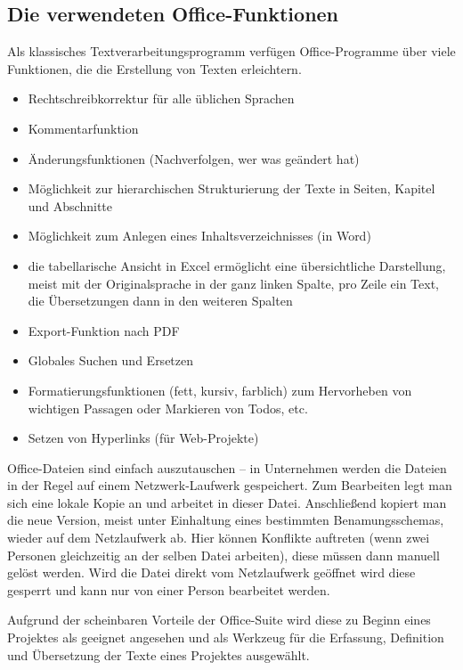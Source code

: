 \documentclass[11pt,a4paper]{article}
\begin{document}
\subsection{Die verwendeten Office-Funktionen}

Als klassisches Textverarbeitungsprogramm verfügen Office-Programme über viele Funktionen, die die Erstellung von Texten erleichtern.

\begin{itemize}
\item{Rechtschreibkorrektur für alle üblichen Sprachen}
\item{Kommentarfunktion}
\item{Änderungsfunktionen (Nachverfolgen, wer was geändert hat)}
\item{Möglichkeit zur hierarchischen Strukturierung der Texte in Seiten, Kapitel und Abschnitte}
\item{Möglichkeit zum Anlegen eines Inhaltsverzeichnisses (in Word)}
\item{die tabellarische Ansicht in Excel ermöglicht eine übersichtliche Darstellung, meist mit der Originalsprache in der ganz linken Spalte, pro Zeile ein Text, die Übersetzungen dann in den weiteren Spalten}
\item{Export-Funktion nach PDF}
\item{Globales Suchen und Ersetzen}
\item{Formatierungsfunktionen (fett, kursiv, farblich) zum Hervorheben von wichtigen Passagen oder Markieren von Todos, etc.}
\item{Setzen von Hyperlinks (für Web-Projekte)}
\end{itemize}

Office-Dateien sind einfach auszutauschen – in Unternehmen werden die Dateien in der Regel auf einem Netzwerk-Laufwerk gespeichert. Zum Bearbeiten legt man sich eine lokale Kopie an und arbeitet in dieser Datei. Anschließend kopiert man die neue Version, meist unter Einhaltung eines bestimmten Benamungsschemas, wieder auf dem Netzlaufwerk ab. Hier können Konflikte auftreten (wenn zwei Personen gleichzeitig an der selben Datei arbeiten), diese müssen dann manuell gelöst werden. Wird die Datei direkt vom Netzlaufwerk geöffnet wird diese gesperrt und kann nur von einer Person bearbeitet werden.

Aufgrund der scheinbaren Vorteile der Office-Suite wird diese zu Beginn eines Projektes als geeignet angesehen und als Werkzeug für die Erfassung, Definition und Übersetzung der Texte eines Projektes ausgewählt.
\end{document}
